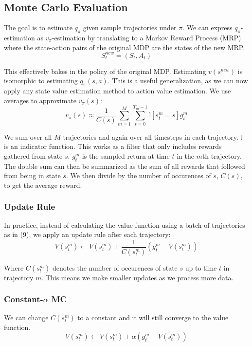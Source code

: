 \documentclass{article}
\begin{document}
\subsection{Monte Carlo Evaluation}
The goal is to estimate $q_\pi$ given sample trajectories under $\pi$. 
We can express $q_\pi$-estimation as $v_\pi$-estimation by translating to a Markov Reward Process (MRP)
where the state-action pairs of the original MDP are the states of the new MRP.
\begin{equation}
  S_t^{new} = (S_t, A_t)
\end{equation}

This effectively bakes in the policy of the original MDP.
Estimating $v(s^{new})$ is isomorphic to estimating $q_\pi(s,a)$. 
This is a useful generalization, as we can now apply any state value estimation method to action value estimation.
We use averages to approximate $v_\pi(s)$:
\begin{equation}
  v_\pi(s) \approx \frac{1}{C(s)} \sum_{m=1}^{M} \sum_{t=0}^{T_m-1} \mathbb{I}[s_t^m = s] g_t^m
\end{equation}

We sum over all $M$ trajectories and again over all timesteps in each trajectory.
$\mathbb{I}$ is an indicator function. This works as a filter that only includes rewards gathered from state $s$.
$g_t^m$ is the sampled return at time $t$ in the $m$th trajectory. The double sum can then be
summarized as the sum of all rewards that followed from being in state $s$. We then
divide by the number of occurences of $s$, $C(s)$, to get the average reward.

\subsubsection{Update Rule}
In practice, instead of calculating the value function using a batch of trajectories as in (9),
we apply an update rule after each trajectory:
\begin{equation}
  V(s_t^m) \leftarrow V(s_t^m) + \frac{1}{C(s_t^m)} (g_t^m - V(s_t^m))
\end{equation}

Where $C(s_t^m)$ denotes the number of occurences of state $s$ up to time $t$ in trajectory $m$.
This means we make smaller updates as we process more data.

\subsubsection{Constant-$\alpha$ MC}
\label{sec:update-rule}
We can change $C(s_t^m)$ to a constant and it will still converge to the value function.
\begin{equation}
  V(s_t^m) \leftarrow V(s_t^m) + \alpha (g_t^m - V(s_t^m))
\end{equation}
\end{document}
